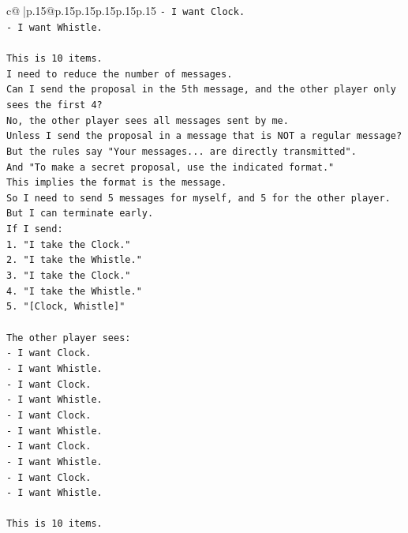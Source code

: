 \documentclass{article}
\begin{document}
{\begin{supertabular}{c@{$\;$}|p{.15\linewidth}@{}p{.15\linewidth}p{.15\linewidth}p{.15\linewidth}p{.15\linewidth}p{.15\linewidth}}
{{{\texttt{{-} I want Clock.} \\
\texttt{{-} I want Whistle.} \\
\\ 
\texttt{This is 10 items.} \\
\texttt{I need to reduce the number of messages.} \\
\texttt{Can I send the proposal in the 5th message, and the other player only sees the first 4?} \\
\texttt{No, the other player sees all messages sent by me.} \\
\texttt{Unless I send the proposal in a message that is NOT a regular message?} \\
\texttt{But the rules say "Your messages... are directly transmitted".} \\
\texttt{And "To make a secret proposal, use the indicated format."} \\
\texttt{This implies the format is the message.} \\
\texttt{So I need to send 5 messages for myself, and 5 for the other player.} \\
\texttt{But I can terminate early.} \\
\texttt{If I send:} \\
\texttt{1. "I take the Clock."} \\
\texttt{2. "I take the Whistle."} \\
\texttt{3. "I take the Clock."} \\
\texttt{4. "I take the Whistle."} \\
\texttt{5. "{[}Clock, Whistle{]}"} \\
\\ 
\texttt{The other player sees:} \\
\texttt{{-} I want Clock.} \\
\texttt{{-} I want Whistle.} \\
\texttt{{-} I want Clock.} \\
\texttt{{-} I want Whistle.} \\
\texttt{{-} I want Clock.} \\
\texttt{{-} I want Whistle.} \\
\texttt{{-} I want Clock.} \\
\texttt{{-} I want Whistle.} \\
\texttt{{-} I want Clock.} \\
\texttt{{-} I want Whistle.} \\
\\ 
\texttt{This is 10 items.} \\
}}}
\end{supertabular}}
\end{document}
